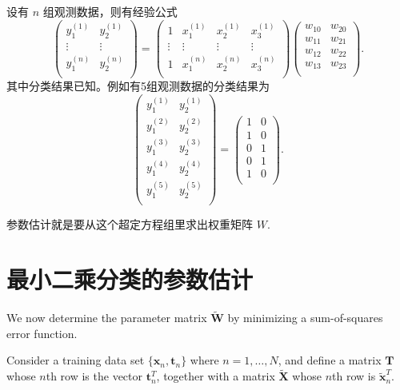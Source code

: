 \documentclass{article}
\begin{document}
{设有 $n$ 组观测数据，则有经验公式
$$
\begin{pmatrix}
y_1^{(1)} & y_2^{(1)} \\
\vdots & \vdots \\ 
y_1^{(n)} & y_2^{(n)} \\
\end{pmatrix}
=
\begin{pmatrix}
1 & x_1^{(1)} & x_2^{(1)} & x_3^{(1)} \\ 
\vdots & \vdots & \vdots & \vdots  \\ 
1 & x_1^{(n)} & x_2^{(n)} & x_3^{(n)} \\ 
\end{pmatrix}
\begin{pmatrix} 
w_{10} & w_{20} \\ 
w_{11} & w_{21} \\ 
w_{12} & w_{22} \\ 
w_{13} & w_{23} \\ 
\end{pmatrix}.
$$
其中分类结果已知。例如有5组观测数据的分类结果为
$$
\begin{pmatrix}
y_1^{(1)} & y_2^{(1)} \\
y_1^{(2)} & y_2^{(2)} \\
y_1^{(3)} & y_2^{(3)} \\
y_1^{(4)} & y_2^{(4)} \\
y_1^{(5)} & y_2^{(5)} \\
\end{pmatrix}
=
\begin{pmatrix} 
1&0 \\ 
1&0 \\ 
0&1 \\ 
0&1 \\ 
1&0 \\ 
\end{pmatrix}. 
$$

参数估计就是要从这个超定方程组里求出权重矩阵 $W$. 


}

\section{最小二乘分类的参数估计}

We now determine the parameter matrix $\widetilde{\mathbf{W}}$ by minimizing a sum-of-squares error function. 

Consider a training data set $\{\mathbf{x}_n, \mathbf{t}_n\}$ where $n = 1, \ldots, N$, and define a matrix $\mathbf{T}$ whose $n$th row is the vector $\mathbf{t}_n^T$, together with a matrix $\widetilde{\mathbf{X}}$ whose $n$th row is $\widetilde{\mathbf{x}}_n^T$. 
\end{document}
